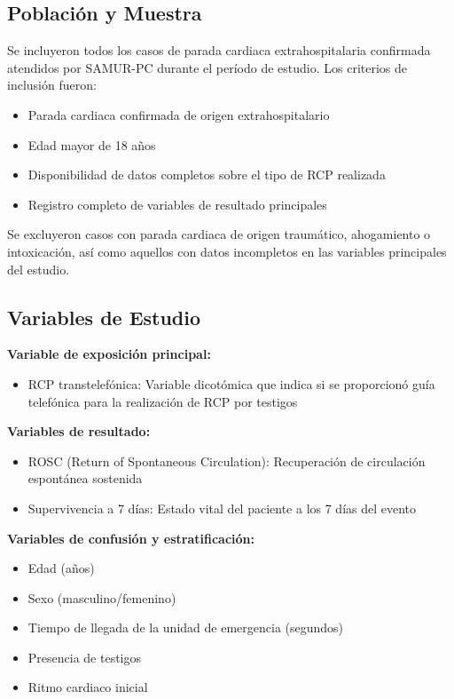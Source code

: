 \documentclass[10pt,a4paper]{article}
\begin{document}
\begin{multicols}{2}
\subsection{Población y Muestra}
Se incluyeron todos los casos de parada cardiaca extrahospitalaria confirmada atendidos por SAMUR-PC durante el período de estudio. Los criterios de inclusión fueron:
\begin{itemize}
\item Parada cardiaca confirmada de origen extrahospitalario
\item Edad mayor de 18 años
\item Disponibilidad de datos completos sobre el tipo de RCP realizada
\item Registro completo de variables de resultado principales
\end{itemize}

Se excluyeron casos con parada cardiaca de origen traumático, ahogamiento o intoxicación, así como aquellos con datos incompletos en las variables principales del estudio.

\subsection{Variables de Estudio}

\textbf{Variable de exposición principal:}
\begin{itemize}
\item RCP transtelefónica: Variable dicotómica que indica si se proporcionó guía telefónica para la realización de RCP por testigos
\end{itemize}

\textbf{Variables de resultado:}
\begin{itemize}
\item ROSC (Return of Spontaneous Circulation): Recuperación de circulación espontánea sostenida
\item Supervivencia a 7 días: Estado vital del paciente a los 7 días del evento
\end{itemize}

\textbf{Variables de confusión y estratificación:}
\begin{itemize}
\item Edad (años)
\item Sexo (masculino/femenino)
\item Tiempo de llegada de la unidad de emergencia (segundos)
\item Presencia de testigos
\item Ritmo cardiaco inicial
\end{itemize}


\end{multicols}
\end{document}
